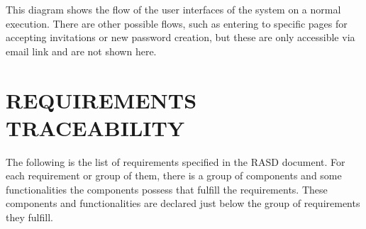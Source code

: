 \documentclass{article}
\begin{document}
This diagram shows the flow of the user interfaces of the system on a normal execution. There are other
possible flows, such as entering to specific pages for accepting invitations or new password creation, but
these are only accessible via email link and are not shown here.

\section{REQUIREMENTS TRACEABILITY}

The following is the list of requirements specified in the RASD document. For each requirement or group of them,
there is a group of components and some functionalities the components possess that fulfill the requirements. These 
components and functionalities are declared just below the group of requirements they fulfill.
\end{document}
